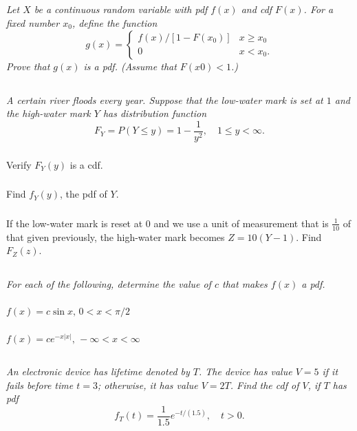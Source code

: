\documentclass[12pt]{amsart}
\begin{document}
\subsection{} %
\textit{Let \(X\) be a continuous random variable with pdf \(f(x)\) and cdf \(F(x)\). For a fixed number \(x_0\), define the function
	\[g(x) = \begin{cases}
		f(x)/[1 − F(x_0)] & x\geq x_0 \\
		0 & x < x_0.
	\end{cases} \]
	Prove that \(g(x)\) is a pdf. (Assume that \(F(x0) < 1\).)}


\subsection{} %
\textit{A certain river floods every year. Suppose that the low-water mark is set at \(1\) and the
	high-water mark \(Y\) has distribution function}
	\[ F_Y = P(Y\leq y) = 1-\frac{1}{y^2}, \quad 1\leq y<\infty. \]
	\subsubsection{} Verify \(F_Y(y)\) is a cdf.
	
	\subsubsection{} Find \(f_Y(y)\), the pdf of \(Y\).
	
	\subsubsection{} If the low-water mark is reset at \(0\) and we use a unit of measurement that is $\frac{1}{10}$ of
		that given previously, the high-water mark becomes \(Z = 10(Y − 1)\). Find \(F_Z(z)\).
		


\subsection{} %
\textit{For each of the following, determine the value of $c$ that makes $f(x)$ a pdf.}
	\subsubsection{}
	\( f(x) = c\sin x,\, 0<x<\pi/2 \)
	
	\subsubsection{}
	\( f(x) = ce^{-x|x|},\, -\infty<x<\infty \)
	


\subsection{} %
\textit{An electronic device has lifetime denoted by $T$. The device has value $V = 5$ if it fails
	before time $t = 3$; otherwise, it has value $V = 2T$. Find the cdf of $V$, if $T$ has pdf}
	\[ f_T(t) = \frac{1}{1.5}e^{-t/(1.5)},\quad t>0.\]
\end{document}
